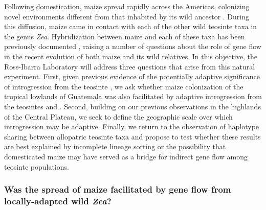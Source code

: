 

Following domestication, maize spread rapidly across the Americas, colonizing novel environments different from that inhabited by its wild ancestor \zp. 
During this diffusion, maize came in contact with each of the other wild teosinte taxa in the genus \emph{Zea}.  
Hybridization between maize and each of these taxa has been previously documented \citep[see][for a review]{doebley1990molecular}, raising a number of questions about the role of gene flow in the recent evolution of both maize and its wild relatives.
In this objective, the Ross-Ibarra Laboratory  will address three questions that arise from this natural experiment.  
First, given previous evidence of the potentially adaptive significance of introgression from the teosinte \zm, we ask whether maize colonization of the tropical lowlands of Guatemala was also facilitated by adaptive introgression from the teosintes \zl{} and \zh.
Second, building on our previous observations in the highlands of the Central Plateau, we seek to define the geographic scale over which introgression may be adaptive.
Finally, we return to the observation of haplotype sharing between allopatric teosinte taxa \citep{Ross-Ibarra2009a} and propose to test whether these results are best explained by incomplete lineage sorting or the possibility that domesticated maize may have served as a bridge for indirect gene flow among teosinte populations. 

\subsubsection{Was the spread of maize facilitated by gene flow from locally-adapted wild \emph{Zea}?}
\label{sss:adaptive_intro}


